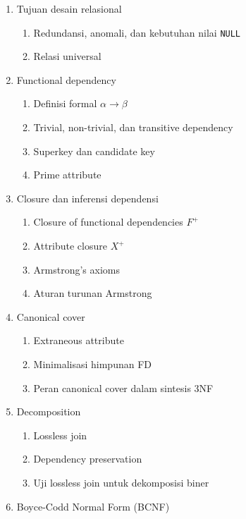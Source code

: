 \begin{enumerate}
    \item \pwajib Tujuan desain relasional
    \begin{enumerate}
        \item \pwajib Redundansi, anomali, dan kebutuhan nilai \texttt{NULL}
        \item \pwajib Relasi universal
    \end{enumerate}
    \item \pwajib Functional dependency
    \begin{enumerate}
        \item \pwajib Definisi formal \(\alpha \rightarrow \beta\)
        \item \pwajib Trivial, non-trivial, dan transitive dependency
        \item \pwajib Superkey dan candidate key
        \item \ppaham Prime attribute
    \end{enumerate}
    \item \pwajib Closure dan inferensi dependensi
    \begin{enumerate}
        \item \pwajib Closure of functional dependencies \(F^+\)
        \item \pwajib Attribute closure \(X^+\)
        \item \pwajib Armstrong's axioms
        \item \ppaham Aturan turunan Armstrong
    \end{enumerate}
    \item \pwajib Canonical cover
    \begin{enumerate}
        \item \pwajib Extraneous attribute
        \item \pwajib Minimalisasi himpunan FD
        \item \pwajib Peran canonical cover dalam sintesis 3NF
    \end{enumerate}
    \item \pwajib Decomposition
    \begin{enumerate}
        \item \pwajib Lossless join
        \item \pwajib Dependency preservation
        \item \ppaham Uji lossless join untuk dekomposisi biner
    \end{enumerate}
    \item \pwajib Boyce-Codd Normal Form (BCNF)

\end{enumerate}
